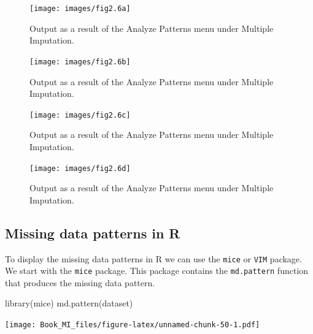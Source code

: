 \documentclass[
]{book}
\newenvironment{Shaded}{\begin{snugshade}}{\end{snugshade}}
\newcommand{\FunctionTok}[1]{\textcolor[rgb]{0.00,0.00,0.00}{#1}}
\newcommand{\NormalTok}[1]{#1}
\begin{document}
\begin{figure}

{\centering \texttt{[image: images/fig2.6a]} 

}

\caption{Output as a result of the Analyze Patterns menu under Multiple Imputation.}\label{fig:fig2-6-1}
\end{figure}
\begin{figure}

{\centering \texttt{[image: images/fig2.6b]} 

}

\caption{Output as a result of the Analyze Patterns menu under Multiple Imputation.}\label{fig:fig2-6-2}
\end{figure}
\begin{figure}

{\centering \texttt{[image: images/fig2.6c]} 

}

\caption{Output as a result of the Analyze Patterns menu under Multiple Imputation.}\label{fig:fig2-6-3}
\end{figure}
\begin{figure}

{\centering \texttt{[image: images/fig2.6d]} 

}

\caption{Output as a result of the Analyze Patterns menu under Multiple Imputation.}\label{fig:fig2-6-4}
\end{figure}

\hypertarget{missing-data-patterns-in-r}{%
\subsection{Missing data patterns in R}\label{missing-data-patterns-in-r}}

To display the missing data patterns in R we can use the \texttt{mice} or \texttt{VIM} package. We start with the \texttt{mice} package. This package contains the \texttt{md.pattern} function that produces the missing data pattern.

\begin{Shaded}
\begin{Highlighting}[]
\FunctionTok{library}\NormalTok{(mice)}
\FunctionTok{md.pattern}\NormalTok{(dataset)}
\end{Highlighting}
\end{Shaded}

\texttt{[image: Book\_MI\_files/figure-latex/unnamed-chunk-50-1.pdf]}
\end{document}
